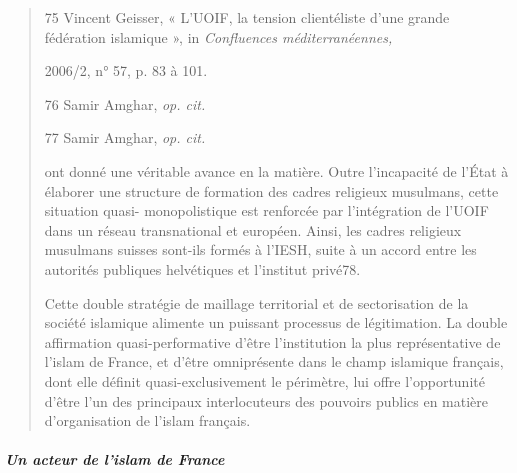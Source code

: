 \begin{quote}
75 Vincent Geisser, « L'UOIF, la tension clientéliste d'une grande
fédération islamique », in \emph{Confluences méditerranéennes,}

2006/2, n° 57, p. 83 à 101.

76 Samir Amghar, \emph{op. cit.}

77 Samir Amghar, \emph{op. cit.}



ont donné une véritable avance en la matière. Outre l'incapacité de
l'État à élaborer une structure de formation des cadres religieux
musulmans, cette situation quasi- monopolistique est renforcée par
l'intégration de l'UOIF dans un réseau transnational et européen. Ainsi,
les cadres religieux musulmans suisses sont-ils formés à l'IESH, suite à
un accord entre les autorités publiques helvétiques et l'institut
privé78.

Cette double stratégie de maillage territorial et de sectorisation de la
société islamique alimente un puissant processus de légitimation. La
double affirmation quasi-performative d'être l'institution la plus
représentative de l'islam de France, et d'être omniprésente dans le
champ islamique français, dont elle définit quasi-exclusivement le
périmètre, lui offre l'opportunité d'être l'un des principaux
interlocuteurs des pouvoirs publics en matière d'organisation de l'islam
français.
\end{quote}

\hypertarget{un-acteur-de-lislam-de-france}{%
\subparagraph{Un acteur de l'islam de
France}\label{un-acteur-de-lislam-de-france}}

